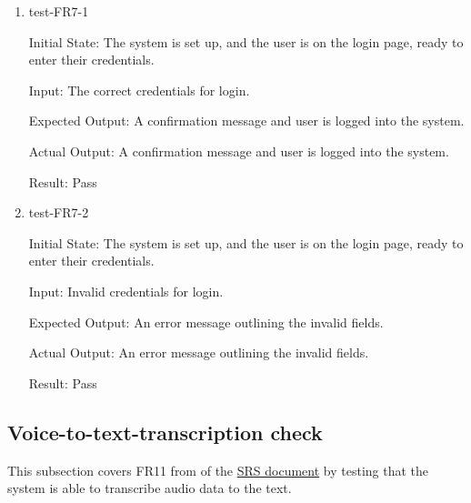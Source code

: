 \documentclass[12pt, titlepage]{article}
\begin{document}
\begin{enumerate}

  \item{test-FR7-1} \label{test-FR7-1}
  
  Initial State:  The system is set up, and the user is on the login page, ready to enter their credentials.

  Input: The correct credentials for login.

  Expected Output: A confirmation message and user is logged into the system.

  Actual Output: A confirmation message and user is logged into the system.

  Result: Pass


  \item{test-FR7-2} \label{test-FR7-2}

  Initial State:  The system is set up, and the user is on the login page, ready to enter their credentials.

  Input: Invalid credentials for login.

  Expected Output: An error message outlining the invalid fields.

  Actual Output: An error message outlining the invalid fields.

  Result: Pass

\end{enumerate}

\subsection{Voice-to-text-transcription check} \label{section:3.5}

This subsection covers FR11 from of the \href{https://github.com/Inreet-Kaur/capstone/blob/main/docs/SRS/SRS.pdf} {SRS document} by testing that the system is able to transcribe audio data to the text.
\end{document}
